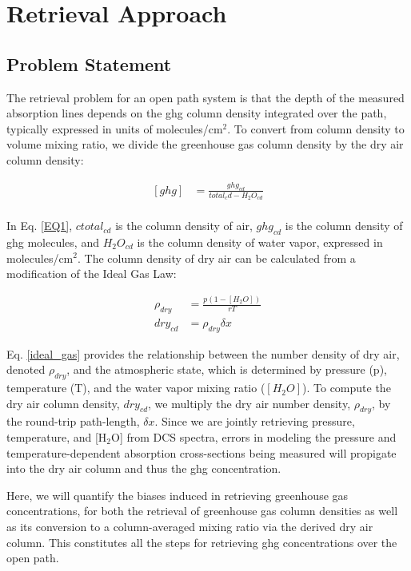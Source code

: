 \documentclass[amt, manuscript]{copernicus}
\begin{document}
\section{Retrieval Approach}
\subsection{Problem Statement}
The retrieval problem for an open path system is that the depth of the measured absorption lines depends on the ghg column density integrated over the path, typically expressed in units of molecules/cm$^2$. To convert from column density to volume mixing ratio, we divide the greenhouse gas column density by the dry air column density:

\begin{align}
  \label{EQ1}
  [ghg] &= \frac{ghg_{cd}}{total_cd{} - H_2O_{cd}} \\
\end{align}

In Eq. \ref{EQ1}, $ctotal_{cd}$ is the column density of air, $ghg_{cd}$ is the column density of ghg molecules, and $H_2O_{cd}$ is the column density of water vapor, expressed in molecules/cm$^2$. The column density of dry air can be calculated from a modification of the Ideal Gas Law:

\begin{align}
  \rho_{dry} &= \frac{p(1-[H_2O])}{rT} \label{ideal_gas}\\
  dry_{cd} &= \rho_{dry}\delta x \label{path_amount}
\end{align}

Eq. \ref{ideal_gas} provides the relationship between the number density of dry air, denoted $\rho_{dry}$, and the atmospheric state, which is determined by pressure (p), temperature (T), and the water vapor mixing ratio ($[H_2O]$). To compute the dry air column density, $dry_{cd}$, we multiply the dry air number density, $\rho_{dry}$, by the round-trip path-length, $\delta x$. Since we are jointly retrieving pressure, temperature, and [H$_2$O] from DCS spectra, errors in modeling the pressure and temperature-dependent absorption cross-sections being measured will propigate into the dry air column and thus the ghg concentration. 

Here, we will quantify the biases induced in retrieving greenhouse gas concentrations, for both the retrieval of greenhouse gas column densities as well as its conversion to a column-averaged mixing ratio via the derived dry air column. This constitutes all the steps for retrieving ghg concentrations over the open path.
\end{document}
